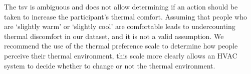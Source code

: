 The \ac{tsv} is ambiguous and does not allow determining if an action should be taken to increase the participant's thermal comfort.
Assuming that people who are `slightly warm' or `slightly cool' are comfortable leads to undercounting thermal discomfort in our dataset, and it is not a valid assumption.
We recommend the use of the thermal preference scale to determine how people perceive their thermal environment, this scale more clearly allows an HVAC system to decide whether to change or not the thermal environment.